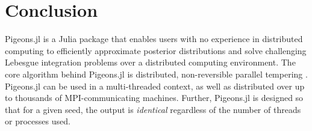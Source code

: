 \section{Conclusion}
Pigeons.jl is a Julia package that enables users with no experience in distributed 
computing to efficiently approximate posterior distributions and solve challenging 
Lebesgue integration problems over a distributed computing environment.
The core algorithm behind Pigeons.jl is distributed, non-reversible parallel tempering 
\cite{syed2021nrpt,surjanovic2022vpt}. Pigeons.jl can be used in a multi-threaded context, 
as well as distributed over up to thousands of MPI-communicating machines. 
Further, Pigeons.jl is designed so that for a given seed, the output is \textit{identical}
regardless of the number of threads or processes used.
